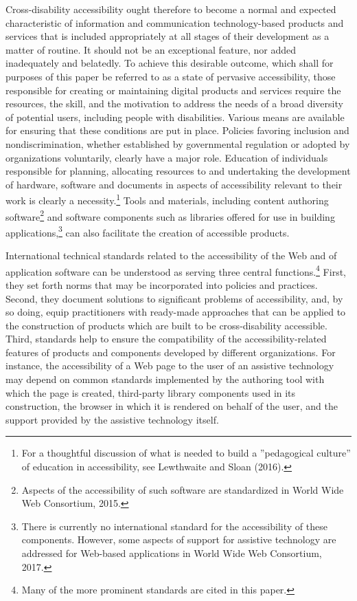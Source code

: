 \documentclass{sig-alternate} %
\begin{document}
\begin{large}
Cross-disability accessibility ought therefore to become a normal and expected characteristic of information and communication technology-based products and services that is included appropriately at all stages of their development as a matter of routine. It should not be an exceptional feature, nor added inadequately and belatedly. To achieve this desirable outcome, which shall for purposes of this paper be referred to as a state of pervasive accessibility, those responsible for creating or maintaining digital products and services require the resources, the skill, and the motivation to address the needs of a broad diversity of potential users, including people with disabilities. Various means are available for ensuring that these conditions are put in place. Policies favoring inclusion and nondiscrimination, whether established by governmental regulation or adopted by organizations voluntarily, clearly have a major role. Education of individuals responsible for planning, allocating resources to and undertaking the development of hardware, software and documents in aspects of accessibility relevant to their work is clearly a necessity.\footnote{For a thoughtful discussion of what is needed to build a ”pedagogical culture” of education in accessibility, see Lewthwaite and Sloan (2016).} Tools and materials, including content authoring software\footnote{Aspects of the accessibility of such software are standardized in World Wide Web Consortium, 2015.} and software components such as libraries offered for use in building applications,\footnote{There is currently no international standard for the accessibility of these components. However, some aspects of support for assistive technology are addressed for Web-based applications in World Wide Web Consortium, 2017.} can also facilitate the creation of accessible products.

International technical standards related to the accessibility of the Web and of application software can be understood as serving three central functions.\footnote{Many of the more prominent standards are cited in this paper.} First, they set forth norms that may be incorporated into policies and practices. Second, they document solutions to significant problems of accessibility, and, by so doing, equip practitioners with ready-made approaches that can be applied to the construction of products which are built to be cross-disability accessible. Third, standards help to ensure the compatibility of the accessibility-related features of products and components developed by different organizations. For instance, the accessibility of a Web page to the user of an assistive technology may depend on common standards implemented by the authoring tool with which the page is created, third-party library components used in its construction, the browser in which it is rendered on behalf of the user, and the support provided by the assistive technology itself.


\end{large}
\end{document}
